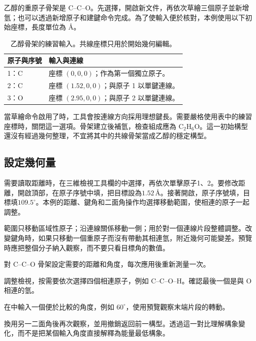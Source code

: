乙醇的重原子骨架是 C--C--O。先選擇，開啟新文件，再依次草繪三個原子並新增氫；也可以透過新增原子和建鍵命令完成。為了使輸入便於核對，本例使用以下初始座標，長度單位為 \AA。

\begin{table}[htbp]
\centering
\caption{乙醇骨架的練習輸入。共線座標只用於開始幾何編輯。}
\begin{tabularx}{\linewidth}{lX}
\toprule
原子與序號 & 輸入與連線 \\
\midrule
1：C & 座標 $(0,0,0)$；作為第一個獨立原子。\\
2：C & 座標 $(1.52,0,0)$；與原子 1 以單鍵連線。\\
3：O & 座標 $(2.95,0,0)$；與原子 2 以單鍵連線。\\
\bottomrule
\end{tabularx}
\end{table}

當草繪命令啟用了時，工具會按連線方向採用理想鍵長。需要嚴格使用表中的練習座標時，關閉這一選項。骨架建立後補氫，檢查組成應為 $\mathrm{C_2H_6O}$。這一初始構型還沒有經過幾何整理，不宜將其中的共線骨架當成乙醇的穩定構型。

\subsection{設定幾何量}

需要讀取距離時，在三維檢視工具欄的中選擇，再依次單擊原子1、2。要修改距離，開啟頂部，在原子序號中填，把目標設為$1.52\,\text{\AA}$。接著開啟，原子序號填，目標填$109.5^\circ$。本例的距離、鍵角和二面角操作均選擇移動範圍，使相連的原子一起調整。

範圍只移動區域性原子；沿連線關係移動一側；用於對一個連線片段整體調整。改變鍵角時，如果只移動一個重原子而沒有帶動其相連氫，附近幾何可能變差。預覽時應把整個分子納入觀察，而不要只看目標角的數值。

\begin{steps}
  \item 對 C--C--O 骨架設定需要的距離和角度，每次應用後重新測量一次。
  \item 調整檢視，按需要依次選擇四個相連原子，例如 C--C--O--H。確認最後一個是與 O 相連的氫。
  \item 在中輸入一個便於比較的角度，例如 $60^\circ$，使用預覽觀察末端片段的轉動。
  \item 換用另一二面角後再次觀察，並用撤銷返回前一構型。透過這一對比理解構象變化，而不是把某個輸入角度直接解釋為能量最低構象。
\end{steps}

